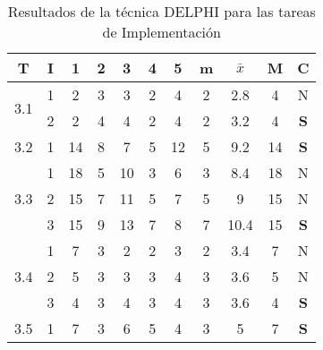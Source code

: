 \documentclass[11pt,a4paper,spanish,twoside]{report}
\begin{document}
\begin{table}[!h]
\centering
  \begin{tabular}{|c|c||c|c|c|c|c||c|c|c||c|}
    \hline
    \textbf{T} & \textbf{I} & \textbf{1} &
    \textbf{2} & \textbf{3} & \textbf{4} & \textbf{5} & \textbf{m}
    &\textbf{$\bar{x}$} &\textbf{M} & \textbf{C}\\    
    \hline \hline
    \multirow{2}{*}{3.1}& 1 & 2 & 3 & 3 & 2 & 4 & 2 & 2.8 & 4 & N \\
    & 2 & 2 & 4 & 4 & 2 & 4 & 2 & 3.2 & 4 & \textbf{S} \\
    \hline

    3.2 & 1 & 14 & 8 & 7 & 5 & 12 & 5 & 9.2 & 14 & \textbf{S} \\
    \hline

    \multirow{3}{*}{3.3}& 1 & 18 & 5 & 10 & 3 & 6 & 3 & 8.4 & 18 & N \\
    & 2 & 15 & 7 & 11 & 5 & 7 & 5 & 9 & 15 & N \\
    & 3 & 15 & 9 & 13 & 7 & 8 & 7 & 10.4 & 15 & \textbf{S} \\
    \hline

    \multirow{3}{*}{3.4}& 1 & 7 & 3 & 2 & 2 & 3 & 2 & 3.4 & 7 & N \\
    & 2 & 5 & 3 & 3 & 3 & 4 & 3 & 3.6 & 5 & N \\
    & 3 & 4 & 3 & 4 & 3 & 4 & 3 & 3.6 & 4 & \textbf{S} \\
    \hline

    3.5 & 1 & 7 & 3 & 6 & 5 & 4 & 3 & 5 & 7 & \textbf{S} \\
    \hline

  \end{tabular}
  \caption{Resultados de la técnica DELPHI para las tareas de
    Implementación} \label{Tab:imp}
\end{table}
\end{document}
